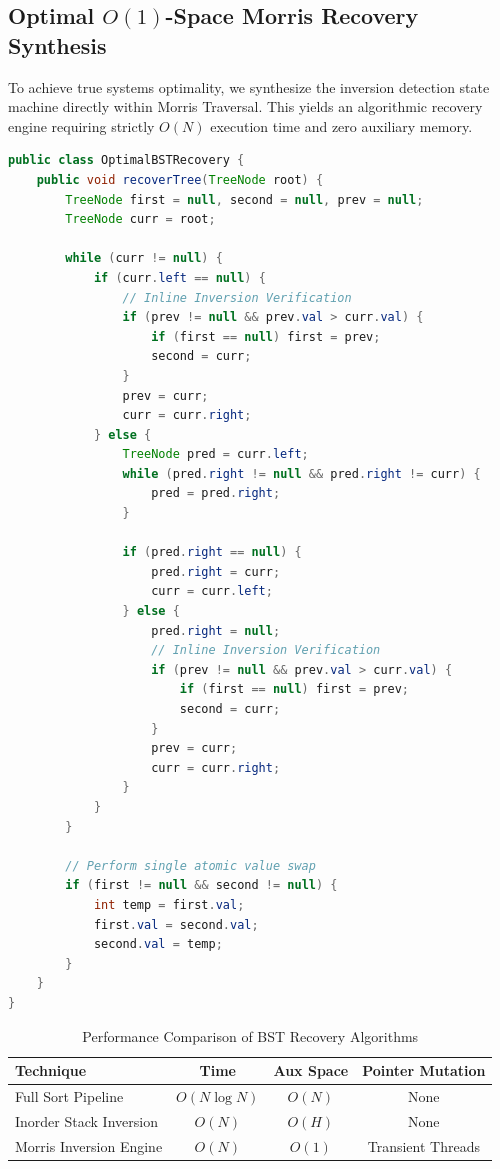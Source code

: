 \documentclass[10pt,twocolumn,letterpaper]{article}
\begin{document}
\subsection{Optimal $O(1)$-Space Morris Recovery Synthesis}

To achieve true systems optimality, we synthesize the inversion detection state machine directly within Morris Traversal. This yields an algorithmic recovery engine requiring strictly $O(N)$ execution time and zero auxiliary memory.

\begin{lstlisting}[language=Java,caption={Constant-Space Morris BST Recovery}]
public class OptimalBSTRecovery {
    public void recoverTree(TreeNode root) {
        TreeNode first = null, second = null, prev = null;
        TreeNode curr = root;

        while (curr != null) {
            if (curr.left == null) {
                // Inline Inversion Verification
                if (prev != null && prev.val > curr.val) {
                    if (first == null) first = prev;
                    second = curr;
                }
                prev = curr;
                curr = curr.right;
            } else {
                TreeNode pred = curr.left;
                while (pred.right != null && pred.right != curr) {
                    pred = pred.right;
                }

                if (pred.right == null) {
                    pred.right = curr;
                    curr = curr.left;
                } else {
                    pred.right = null;
                    // Inline Inversion Verification
                    if (prev != null && prev.val > curr.val) {
                        if (first == null) first = prev;
                        second = curr;
                    }
                    prev = curr;
                    curr = curr.right;
                }
            }
        }

        // Perform single atomic value swap
        if (first != null && second != null) {
            int temp = first.val;
            first.val = second.val;
            second.val = temp;
        }
    }
}
\end{lstlisting}

\begin{table}[h]
\centering
\caption{Performance Comparison of BST Recovery Algorithms}
\label{tab:recovery-comparison}
\begin{tabular}{lccc}
\toprule
\textbf{Technique} & \textbf{Time} & \textbf{Aux Space} & \textbf{Pointer Mutation} \\
\midrule
Full Sort Pipeline & $O(N \log N)$ & $O(N)$ & None \\
Inorder Stack Inversion & $O(N)$ & $O(H)$ & None \\
Morris Inversion Engine & $O(N)$ & $O(1)$ & Transient Threads \\
\bottomrule
\end{tabular}
\end{table}
\end{document}

